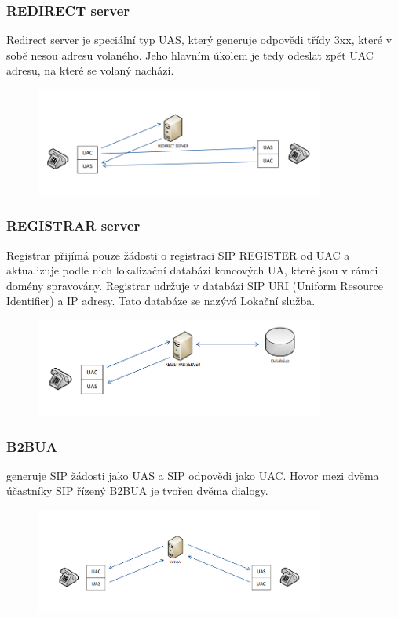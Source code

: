 \subsubsection{REDIRECT server}
Redirect server je speciální typ UAS, který generuje odpovědi třídy 3xx,
které v sobě nesou adresu volaného. Jeho hlavním úkolem je tedy odeslat
zpět UAC adresu, na které se volaný nachází.
\begin{figure} [h]
     \centering
     \includegraphics[width=0.85\textwidth]{images/redirect.PNG}
\end{figure}

\subsubsection{REGISTRAR server}
Registrar přijímá pouze žádosti o registraci SIP REGISTER od UAC a
aktualizuje podle nich lokalizační databázi koncových UA, které jsou v rámci
domény spravovány. Registrar udržuje v databázi SIP URI (Uniform
Resource Identifier) a IP adresy. Tato databáze se nazývá Lokační služba.
\begin{figure} [h]
     \centering
     \includegraphics[width=0.85\textwidth]{images/registrar.PNG}
\end{figure}

\subsubsection{B2BUA}
generuje SIP žádosti jako UAS a SIP odpovědi jako UAC. Hovor mezi
dvěma účastníky SIP řízený B2BUA je tvořen dvěma dialogy.
\begin{figure} [h]
     \centering
     \includegraphics[width=0.85\textwidth]{images/b2bua.PNG}
\end{figure}

